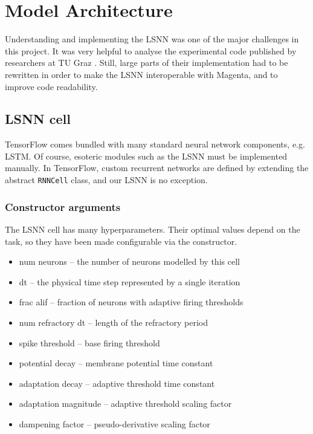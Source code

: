 \documentclass[../../report.tex]{subfiles}
\begin{document}
\section{Model Architecture}

Understanding and implementing the LSNN was one of the major challenges in this
project. It was very helpful to analyse the experimental code published by
researchers at TU Graz \cite{Bellec2018LSNN, Bellec2020}. Still, large parts of
their implementation had to be rewritten in order to make the LSNN interoperable
with Magenta, and to improve code readability.

\subsection{LSNN cell}

TensorFlow comes bundled with many standard neural network components, e.g.
LSTM. Of course, esoteric modules such as the LSNN must be implemented manually.
In TensorFlow, custom recurrent networks are defined by extending the abstract
\texttt{RNNCell} class, and our LSNN is no exception.

\subsubsection{Constructor arguments}
The LSNN cell has many hyperparameters. Their optimal values depend on the task,
so they have been made configurable via the constructor.

\begin{itemize}
  \item num neurons -- the number of neurons modelled by this cell
  \item dt -- the physical time step represented by a single iteration
  \item frac alif -- fraction of neurons with adaptive firing thresholds
  \item num refractory dt -- length of the refractory period
  \item spike threshold -- base firing threshold
  \item potential decay -- membrane potential time constant\footnotemark{}
  \item adaptation decay -- adaptive threshold time constant\footnotemark[\value{footnote}]
  \item adaptation magnitude -- adaptive threshold scaling factor
  \item dampening factor -- pseudo-derivative scaling factor 
\end{itemize}
\end{document}
